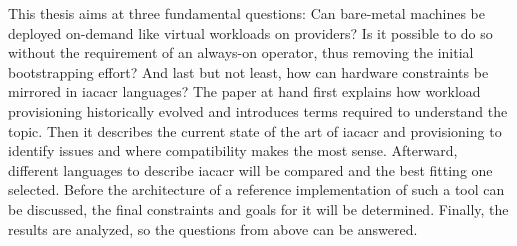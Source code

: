 \newline
This thesis aims at three fundamental questions: Can bare-metal machines be deployed on-demand like virtual workloads on providers? Is it possible to do so without the requirement of an always-on operator, thus removing the initial bootstrapping effort? And last but not least, how can hardware constraints be mirrored in \gls{iacacr} languages?
\newline
The paper at hand first explains how workload provisioning historically evolved and introduces terms required to understand the topic. Then it describes the current state of the art of \gls{iacacr} and provisioning to identify issues and where compatibility makes the most sense. Afterward, different languages to describe \gls{iacacr} will be compared and the best fitting one selected.
Before the architecture of a reference implementation of such a tool can be discussed, the final constraints and goals for it will be determined. Finally, the results are analyzed, so the questions from above can be answered.
